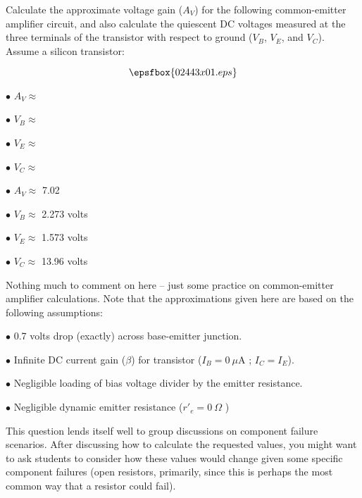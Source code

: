 

Calculate the approximate voltage gain ($A_V$) for the following common-emitter amplifier circuit, and also calculate the quiescent DC voltages measured at the three terminals of the transistor with respect to ground ($V_B$, $V_E$, and $V_C$).  Assume a silicon transistor:

$$\epsfbox{02443x01.eps}$$

\medskip
\goodbreak
\item{$\bullet$} $A_V \approx$ 
\item{$\bullet$} $V_B \approx$  
\item{$\bullet$} $V_E \approx$ 
\item{$\bullet$} $V_C \approx$ 
\medskip







\medskip
\goodbreak
\item{$\bullet$} $A_V \approx$ 7.02
\item{$\bullet$} $V_B \approx$ 2.273 volts
\item{$\bullet$} $V_E \approx$ 1.573 volts
\item{$\bullet$} $V_C \approx$ 13.96 volts
\medskip







Nothing much to comment on here -- just some practice on common-emitter amplifier calculations.  Note that the approximations given here are based on the following assumptions:

\medskip
\goodbreak
\item{$\bullet$} 0.7 volts drop (exactly) across base-emitter junction.
\item{$\bullet$} Infinite DC current gain ($\beta$) for transistor ($I_B = 0 \> \mu$A ; $I_C = I_E$).
\item{$\bullet$} Negligible loading of bias voltage divider by the emitter resistance.
\item{$\bullet$} Negligible dynamic emitter resistance ($r'_e = 0 \> \Omega$ )
\medskip

This question lends itself well to group discussions on component failure scenarios.  After discussing how to calculate the requested values, you might want to ask students to consider how these values would change given some specific component failures (open resistors, primarily, since this is perhaps the most common way that a resistor could fail).




